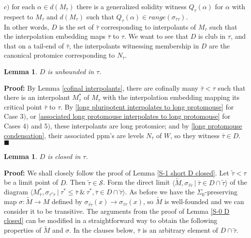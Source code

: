 \documentclass[12pt]{article}
\newtheorem{lem}[thm]{Lemma}
\begin{document}
\indent \indent $c)$ for each $\alpha \in d(M_{\bar{\tau}})$ there is a generalized solidity witness $Q_\tau (\alpha )$ for $\alpha$ with respect to $M_\tau$ and $d(M_\tau)$ such that $Q_\tau (\alpha ) \in range ( \sigma_{\bar{\tau} \tau } )$.\\


In other words, $D$ is the set of $\bar{\tau}$ corresponding to interpolants of $M_\tau$ such that the interpolation embedding maps $\bar{\tau}$ to $\tau$.  We want to see that $D$ is club in $\tau$, and that on a tail-end of $\bar{\tau}$, the interpolants witnessing membership in $D$ are the canonical protomice corresponding to $N_{\bar{\tau}}$.

\begin{lem}
$D$ is unbounded in $\tau$.
\end{lem}

\textbf{Proof:}  By Lemma \ref{cofinal interpolants}, there are cofinally many $\bar{\tau} < \tau$ such that there is an interpolant $M^*_{\bar{\tau}}$ of $M_\tau$ with the interpolation embedding mapping its critical point $\bar{\tau}$ to $\tau$.  By \ref{long pluripotent interpolates to long protomouse} for Case $3)$, or \ref{associated long protomouse interpolates to long protomouse} for Cases $4)$ and $5)$, these interpolants are long protomice; and by \ref{long protomouse condensation}, their associated ppm's are levels $N_{\bar{\tau}}$ of $W$, so they witness $\bar{\tau} \in D$. $\blacksquare$\\


\begin{lem}
$D$ is closed in $\tau$.
\end{lem}

\textbf{Proof:}  We shall closely follow the proof of Lemma \ref{S-1 short D closed}.  Let $\tilde{\tau} < \tau$ be a limit point of $D$.  Then $\tilde{\tau} \in \mathcal{S}$.  Form the direct limit $\langle \tilde{M} , \sigma_{\bar{\tau} \tilde{\tau}} \ | \ \bar{\tau} \in D \cap \tilde{\tau} \rangle$ of the diagram $\langle M_{\bar{\tau}}^* , \sigma_{\tau^* \bar{\tau}} \ | \ \tau^* \leq \bar{\tau} \ \& \ \tau^* , \bar{\tau} \in D \cap \tilde{\tau} \rangle$.  As before we have the $\Sigma_0$-preserving map $\sigma : \tilde{M} \longrightarrow M$ defined by $\sigma_{\bar{\tau} \tilde{\tau}} (x) \longrightarrow \sigma_{\bar{\tau} \tau} (x)$, so $\tilde{M}$ is well-founded and we can consider it to be transitive.  The arguments from the proof of Lemma \ref{S-0 D closed} can be modified in a straightforward way to obtain the following properties of $\tilde{M}$ and $\sigma$.  In the clauses below, $\bar{\tau}$ is an arbitrary element of $D \cap \tilde{\tau}$.
\end{document}

